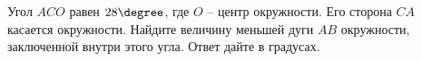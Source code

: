 \begin{ex}
	\begin{condition}
		Угол \( ACO \) равен \( 28\degree \), где \( O \) – центр окружности. Его сторона \( CA \) касается окружности. Найдите величину меньшей дуги \( AB \) окружности, заключенной внутри этого угла. Ответ дайте в градусах.
	\end{condition}
\end{ex}